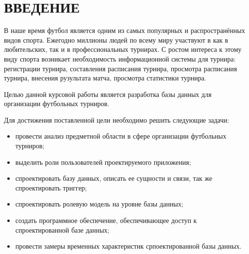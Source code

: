 \section*{\centering ВВЕДЕНИЕ}

В наше время футбол является одним из самых популярных и распространённых видов спорта.
Ежегодно миллионы людей по всему миру участвуют в как в любительских, так и в профессиональных турнирах.
С ростом интереса к этому виду спорта возникает необходимость информационной системы для турнира: регистрации турнира, составления расписания турнира, просмотра расписания турнира, внесения рузультата матча, просмотра статистики турнира.

Целью данной курсовой работы является разработка базы данных для организации футбольных турниров.

Для достижения поставленной цели необходимо решить следующие задачи:
\begin{itemize}
	\item провести анализ предметной области в сфере организации футбольных турниров;
	\item выделить роли пользователей проектируемого приложения;
	\item спроектировать базу данных, описать ее сущности и связи, так же спроектировать триггер;
	\item спроектировать ролевую модель на уровне базы данных;
	\item создать программное обеспечение, обеспечивающее доступ к спроектированной базе данных;
	\item провести замеры временных характеристик српоектированной базы данных.  
\end{itemize}